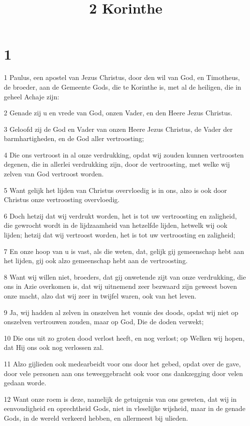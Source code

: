 

\title{2 Korinthe}



\chapter{1}

\par 1 Paulus, een apostel van Jezus Christus, door den wil van God, en Timotheus, de broeder, aan de Gemeente Gods, die te Korinthe is, met al de heiligen, die in geheel Achaje zijn:
\par 2 Genade zij u en vrede van God, onzen Vader, en den Heere Jezus Christus.
\par 3 Geloofd zij de God en Vader van onzen Heere Jezus Christus, de Vader der barmhartigheden, en de God aller vertroosting;
\par 4 Die ons vertroost in al onze verdrukking, opdat wij zouden kunnen vertroosten degenen, die in allerlei verdrukking zijn, door de vertroosting, met welke wij zelven van God vertroost worden.
\par 5 Want gelijk het lijden van Christus overvloedig is in ons, alzo is ook door Christus onze vertroosting overvloedig.
\par 6 Doch hetzij dat wij verdrukt worden, het is tot uw vertroosting en zaligheid, die gewrocht wordt in de lijdzaamheid van hetzelfde lijden, hetwelk wij ook lijden; hetzij dat wij vertroost worden, het is tot uw vertroosting en zaligheid;
\par 7 En onze hoop van u is vast, als die weten, dat, gelijk gij gemeenschap hebt aan het lijden, gij ook alzo gemeenschap hebt aan de vertroosting.
\par 8 Want wij willen niet, broeders, dat gij onwetende zijt van onze verdrukking, die ons in Azie overkomen is, dat wij uitnemend zeer bezwaard zijn geweest boven onze macht, alzo dat wij zeer in twijfel waren, ook van het leven.
\par 9 Ja, wij hadden al zelven in onszelven het vonnis des doods, opdat wij niet op onszelven vertrouwen zouden, maar op God, Die de doden verwekt;
\par 10 Die ons uit zo groten dood verlost heeft, en nog verlost; op Welken wij hopen, dat Hij ons ook nog verlossen zal.
\par 11 Alzo gijlieden ook medearbeidt voor ons door het gebed, opdat over de gave, door vele personen aan ons teweeggebracht ook voor ons dankzegging door velen gedaan worde.
\par 12 Want onze roem is deze, namelijk de getuigenis van ons geweten, dat wij in eenvoudigheid en oprechtheid Gods, niet in vleselijke wijsheid, maar in de genade Gods, in de wereld verkeerd hebben, en allermeest bij ulieden.
